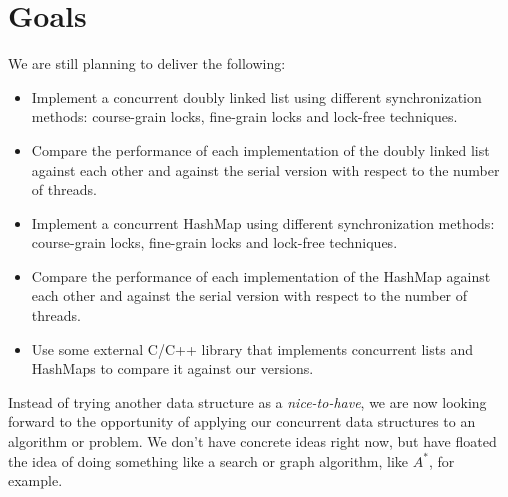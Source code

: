 \documentclass[11pt]{article}
\begin{document}
\section*{Goals}
We are still planning to deliver the following:
\begin{itemize}
\item
Implement a concurrent doubly linked list using different
synchronization methods: course-grain locks, fine-grain locks and lock-free
techniques.
\item Compare the performance of each implementation of the doubly
linked list against each other and against the serial version with respect to
the number of threads.
\item Implement a concurrent HashMap using different synchronization methods:
course-grain locks, fine-grain locks and lock-free techniques.
\item Compare the performance of each implementation of the HashMap against
each other and against the serial version with respect to the number of threads.
\item Use some external C/C++ library that implements concurrent lists and
HashMaps to compare it against our versions.
\end{itemize}

Instead of trying another data structure as a {\it nice-to-have}, we are now
looking forward to the opportunity of applying our concurrent data structures to
an algorithm or problem. We don't have concrete ideas right now, but have
floated the idea of doing something like a search or graph algorithm, like
$A^*$, for example.
\end{document}
